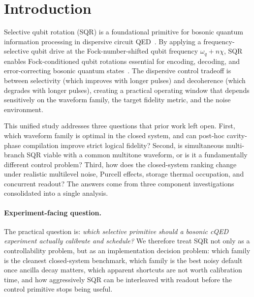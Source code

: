 \documentclass[aps,pra,twocolumn,reprint,amsmath,amssymb]{revtex4-2}
\begin{document}
\maketitle

\section{Introduction}

Selective qubit rotation (SQR) is a foundational primitive for bosonic quantum information processing in dispersive circuit QED~\cite{blais2021circuit,koch2007transmon}. By applying a frequency-selective qubit drive at the Fock-number-shifted qubit frequency $\omega_q + n\chi$, SQR enables Fock-conditioned qubit rotations essential for encoding, decoding, and error-correcting bosonic quantum states~\cite{heeres2015snap,krastanov2015universal}. The dispersive control tradeoff is between selectivity (which improves with longer pulses) and decoherence (which degrades with longer pulses), creating a practical operating window that depends sensitively on the waveform family, the target fidelity metric, and the noise environment.

This unified study addresses three questions that prior work left open. First, which waveform family is optimal in the closed system, and can post-hoc cavity-phase compilation improve strict logical fidelity? Second, is simultaneous multi-branch SQR viable with a common multitone waveform, or is it a fundamentally different control problem? Third, how does the closed-system ranking change under realistic multilevel noise, Purcell effects, storage thermal occupation, and concurrent readout? The answers come from three component investigations consolidated into a single analysis.

\paragraph{Experiment-facing question.}
The practical question is: \emph{which selective primitive should a bosonic cQED experiment actually calibrate and schedule?} We therefore treat SQR not only as a controllability problem, but as an implementation decision problem: which family is the cleanest closed-system benchmark, which family is the best noisy default once ancilla decay matters, which apparent shortcuts are not worth calibration time, and how aggressively SQR can be interleaved with readout before the control primitive stops being useful.
\end{document}
